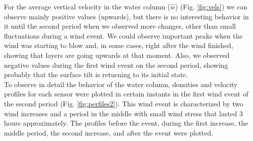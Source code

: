\documentclass[tesis.tex]{subfiles}
\begin{document}
    For the average vertical velocity in the water column ($\hat{w}$) (Fig. \ref{fig:vels}) we can observe mainly positive values (upwards), but there is no interesting behavior in it until the second period when we observed more changes, other than small fluctuations during a wind event. We could observe important peaks when the wind was starting to blow and, in some cases, right after the wind finished, showing that layers are going upwards at that moment. Also, we observed negative values during the first wind event on the second period, showing probably that the surface tilt is returning to its initial state.\\
    
    To observe in detail the behavior of the water column, densities and velocity profiles for each sensor were plotted in certain instants in the first wind event of the second period (Fig. \ref{fig:perfiles2}). This wind event is characterized by two wind increases and a period in the middle with small wind stress that lasted 3 hours approximately. The profiles before the event, during the first increase, the middle period, the second increase, and after the event were plotted.\\

    \newpage
\end{document}
